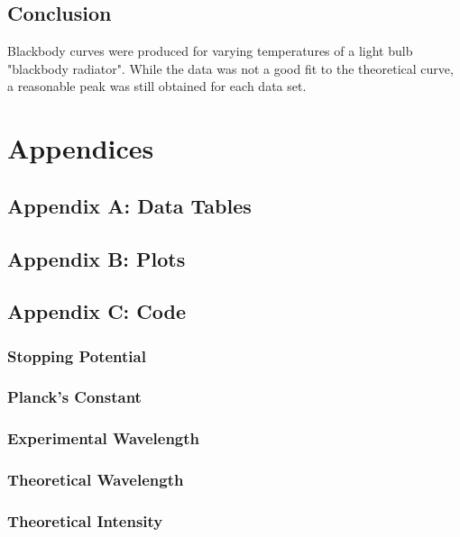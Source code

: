 \documentclass[a4paper]{article}
\begin{document}
\subsection{Conclusion}
Blackbody curves were produced for varying temperatures of a light bulb "blackbody radiator". While the data was not a good fit to the theoretical curve, a reasonable peak was still obtained for each data set.

\section{Appendices}

\subsection{Appendix A: Data Tables}

\subsection{Appendix B: Plots}
\label{app:stoppingPotentialPlots}

\subsection{Appendix C: Code}

\subsubsection{Stopping Potential}
\label{cod:stoppingPotential}

\subsubsection{Planck's Constant}
\label{cod:planck}

\subsubsection{Experimental Wavelength}
\label{cod:expWavelength}

\subsubsection{Theoretical Wavelength}
\label{cod:theoWavelength}

\subsubsection{Theoretical Intensity}
\label{cod:theoIntensity}
\end{document}
